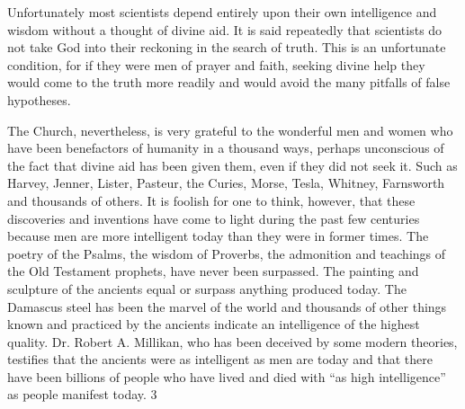 Unfortunately most scientists depend entirely upon their own intelligence and wisdom
without a thought of divine aid. It is said repeatedly that scientists do not take God into their
reckoning in the search of truth. This is an unfortunate condition, for if they were men of
prayer and faith, seeking divine help they would come to the truth more readily and would
avoid the many pitfalls of false hypotheses.

The Church, nevertheless, is very grateful to the wonderful men and women who have been
benefactors of humanity in a thousand ways, perhaps unconscious of the fact that divine aid
has been given them, even if they did not seek it. Such as Harvey, Jenner, Lister, Pasteur, the
Curies, Morse, Tesla, Whitney, Farnsworth and thousands of others. It is foolish for one to
think, however, that these discoveries and inventions have come to light during the past few
centuries because men are more intelligent today than they were in former times. The poetry
of the Psalms, the wisdom of Proverbs, the admonition and teachings of the Old Testament
prophets, have never been surpassed. The painting and sculpture of the ancients equal or
surpass anything produced today. The Damascus steel has been the marvel of the world and
thousands of other things known and practiced by the ancients indicate an intelligence of the
highest quality. Dr. Robert A. Millikan, who has been deceived by some modern theories,
testifies that the ancients were as intelligent as men are today and that there have been
billions of people who have lived and died with ``as high intelligence'' as people manifest
today. 3

